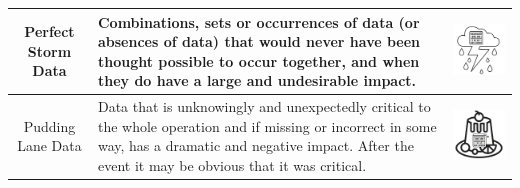 \begin{longtable}{|C{}|L{}|C{}|}
  \\\hline
  Perfect Storm Data &
  Combinations, sets or occurrences of data (or absences of data)
  that would never have been thought possible to occur together,
  and when they do have a large and undesirable impact. &
  \includegraphics[scale=0.55]{images/cygStorm}
  \\\hline
  Pudding Lane Data &
  Data that is unknowingly and unexpectedly critical to the whole operation and if missing
  or incorrect in some way, has a dramatic and negative impact.
  After the event it may be obvious that it was critical. &
  \includegraphics[scale=0.55]{images/cygPudding}
  \\\hline
\end{longtable}

